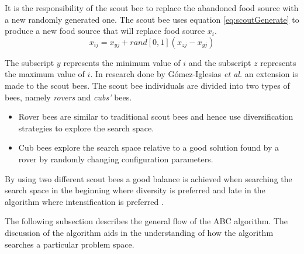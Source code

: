 It is the responsibility of the scout bee to replace the abandoned food source with a new randomly generated one\cite{BeeJobShop,ABCCompareStudy,ABCImageEnhancement}. The scout bee uses equation \ref{eq:scoutGenerate} to produce a new food source that will replace food source $x_i$.
\begin{equation}
\label{eq:scoutGenerate}
x_{ij} = x_{yj} + rand[0,1](x_{zj} - x_{yj})
\end{equation}

The subscript $y$ represents the minimum value of $i$ and the subscript $z$ represents the maximum value of $i$.
In research done by G\'{o}mez-Iglesias \emph{et al.} \cite{ABCFusionGrid} an extension is made to the scout bees. The scout bee individuals are divided into two types of bees, namely \emph{rovers} and \emph{cubs'} bees\cite{ABCFusionGrid}.
\begin{itemize}
\item{Rover bees} are similar to traditional scout bees and hence use diversification strategies to explore the search space. 
\item {Cub bees} explore the search space relative to a good solution found by a rover by randomly changing configuration parameters. 
\end{itemize}
By using two different scout bees a good balance is achieved when searching the search space in the beginning where diversity is preferred and late in the algorithm where intensification is preferred \cite{ABCFusionGrid}.

The following subsection describes the general flow of the \gls{ABC} algorithm. The discussion of the algorithm aids in the understanding of how the algorithm searches a particular problem space. 
